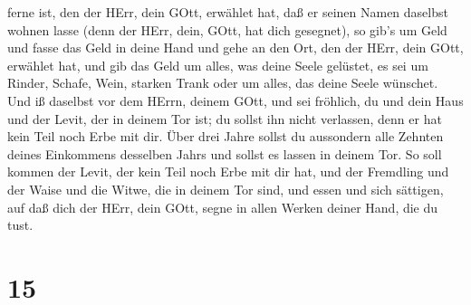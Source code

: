 ferne ist, den der HErr, dein GOtt, erwählet hat, daß er seinen Namen
daselbst wohnen lasse (denn der HErr, dein, GOtt, hat dich gesegnet),
 so gib's um Geld und fasse das Geld in deine Hand und gehe
an den Ort, den der HErr, dein GOtt, erwählet hat,  und gib
das Geld um alles, was deine Seele gelüstet, es sei um Rinder, Schafe,
Wein, starken Trank oder um alles, das deine Seele wünschet. Und iß
daselbst vor dem HErrn, deinem GOtt, und sei fröhlich, du und dein Haus
 und der Levit, der in deinem Tor ist; du sollst ihn nicht
verlassen, denn er hat kein Teil noch Erbe mit dir.  Über
drei Jahre sollst du aussondern alle Zehnten deines Einkommens desselben
Jahrs und sollst es lassen in deinem Tor.  So soll kommen
der Levit, der kein Teil noch Erbe mit dir hat, und der Fremdling und
der Waise und die Witwe, die in deinem Tor sind, und essen und sich
sättigen, auf daß dich der HErr, dein GOtt, segne in allen Werken deiner
Hand, die du tust.

\hypertarget{section-14}{%
\section{15}\label{section-14}}


